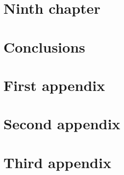 \documentclass[a4paper,twoside,12pt]{book}
\begin{document}
\chapter{Ninth chapter\label{chap:ninth-chapter}}


\chapter*{Conclusions}





\appendix
\chapter{First appendix\label{app:first-appendix}}


\chapter{Second appendix\label{app:second-appendix}}


\chapter{Third appendix\label{app:third-appendix}}

\cleardoublepage{}

\end{document}
